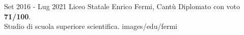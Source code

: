 \sepspace
{}
{Set 2016 - Lug 2021}
{Liceo Statale Enrico Fermi, Cantù}
{Diplomato con voto \textbf{71/100}.\\
Studio di scuola superiore scientifica.}
{images/edu/fermi}
